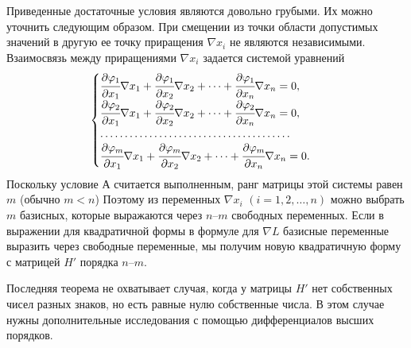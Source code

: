 Приведенные достаточные условия являются довольно грубыми. Их можно уточнить следующим образом. При смещении из точки
области допустимых значений в другую ее точку приращения $\nabla x_i$ не являются независимыми. Взаимосвязь между приращениями $\nabla x_i$ задается системой уравнений
\begin{equation}
  \begin{cases}
  \cfrac{\partial \varphi_1}{\partial x_1}\nabla x_1+\cfrac{\partial \varphi_1}{\partial x_2}\nabla x_2+\dots+\cfrac{\partial \varphi_1}{\partial x_n}\nabla x_n = 0,\\
  \cfrac{\partial \varphi_2}{\partial x_1}\nabla x_1+\cfrac{\partial \varphi_2}{\partial x_2}\nabla x_2+\dots+\cfrac{\partial \varphi_2}{\partial x_n}\nabla x_n = 0,\\
  \dots\dots\dots\dots \dots\dots \dots\dots\dots\dots\dots\dots\dots\\
   \cfrac{\partial \varphi_m}{\partial x_1}\nabla x_1+\cfrac{\partial \varphi_m}{\partial x_2}\nabla x_2+\dots+\cfrac{\partial \varphi_m}{\partial x_n}\nabla x_n = 0.
 \label{equation_6_1}
  \end{cases}
\end{equation}
Поскольку условие $А$ считается выполненным, ранг матрицы этой системы равен $m$ (обычно $m<n$) Поэтому из переменных $\nabla x_i$ $(i = 1,2,\dots,n)$ можно выбрать $m$ базисных, которые выражаются через $n$–$m$ свободных переменных. Если в выражении для квадратичной формы в формуле для
$\nabla L$ базисные переменные выразить через свободные переменные, мы получим новую квадратичную форму с матрицей $H'$ порядка $n$–$m$.


Последняя теорема не охватывает случая, когда у матрицы $H'$ нет собственных чисел разных знаков, но есть равные нулю собственные числа. В этом случае нужны дополнительные исследования с помощью дифференциалов высших порядков.

